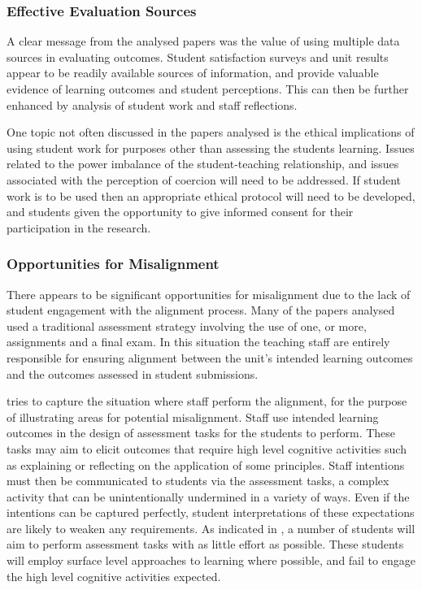 
\subsubsection{Effective Evaluation Sources} %
\label{ssub:effective_evaluation_sources}

A clear message from the analysed papers was the value of using multiple data sources in evaluating outcomes. Student satisfaction surveys and unit results appear to be readily available sources of information, and provide valuable evidence of learning outcomes and student perceptions. This can then be further enhanced by analysis of student work and staff reflections.

One topic not often discussed in the papers analysed is the ethical implications of using student work for purposes other than assessing the students learning. Issues related to the power imbalance of the student-teaching relationship, and issues associated with the perception of coercion will need to be addressed. If student work is to be used then an appropriate ethical protocol will need to be developed, and students given the opportunity to give informed consent for their participation in the research.


\subsubsection{Opportunities for Misalignment} %
\label{ssub:opportinities_for_misalignment}

There appears to be significant opportunities for misalignment due to the lack of student engagement with the alignment process. Many of the papers analysed used a traditional assessment strategy involving the use of one, or more, assignments and a final exam. In this situation the teaching staff are entirely responsible for ensuring alignment between the unit's intended learning outcomes and the outcomes assessed in student submissions. 

 tries to capture the situation where staff perform the alignment, for the purpose of illustrating areas for potential misalignment. Staff use intended learning outcomes in the design of assessment tasks for the students to perform. These tasks may aim to elicit outcomes that require high level cognitive activities such as explaining or reflecting on the application of some principles. Staff intentions must then be communicated to students via the assessment tasks, a complex activity that can be unintentionally undermined in a variety of ways. Even if the intentions can be captured perfectly, student interpretations of these expectations are likely to weaken any requirements. As indicated in , a number of students will aim to perform assessment tasks with as little effort as possible. These students will employ surface level approaches to learning where possible, and fail to engage the high level cognitive activities expected. 

